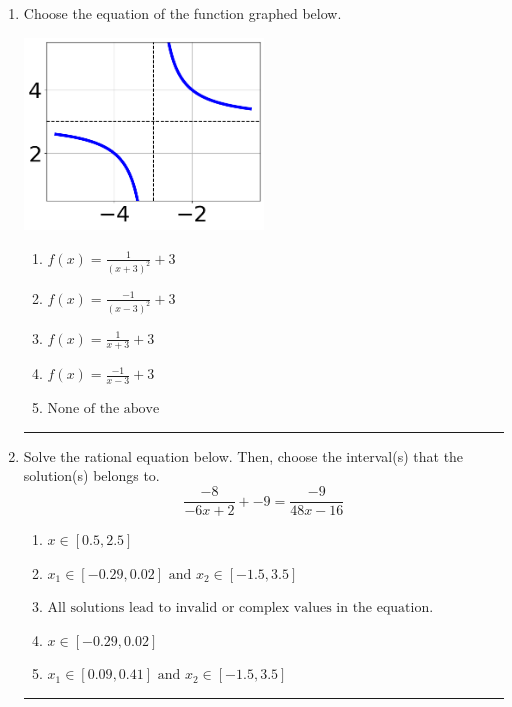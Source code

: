 \documentclass[14pt]{extbook}
\newcommand{\litem}[1]{\item#1\hspace*{-1cm}\rule{\textwidth}{0.4pt}}
\begin{document}
\begin{enumerate}
{\begin{enumerate}[label=\Alph*.]
\end{enumerate} }
\litem{
Choose the equation of the function graphed below.
\begin{center}
    \includegraphics[width=0.5\textwidth]{../Figures/rationalGraphToEquationCopyB.png}
\end{center}
\begin{enumerate}[label=\Alph*.]
\item \( f(x) = \frac{1}{(x + 3)^2} + 3 \)
\item \( f(x) = \frac{-1}{(x - 3)^2} + 3 \)
\item \( f(x) = \frac{1}{x + 3} + 3 \)
\item \( f(x) = \frac{-1}{x - 3} + 3 \)
\item \( \text{None of the above} \)

\end{enumerate} }
\litem{
Solve the rational equation below. Then, choose the interval(s) that the solution(s) belongs to.\[ \frac{-8}{-6x + 2} + -9 = \frac{-9}{48x -16} \]\begin{enumerate}[label=\Alph*.]
\item \( x \in [0.5,2.5] \)
\item \( x_1 \in [-0.29, 0.02] \text{ and } x_2 \in [-1.5,3.5] \)
\item \( \text{All solutions lead to invalid or complex values in the equation.} \)
\item \( x \in [-0.29,0.02] \)
\item \( x_1 \in [0.09, 0.41] \text{ and } x_2 \in [-1.5,3.5] \)


\end{enumerate}}
\end{enumerate}
\end{document}

